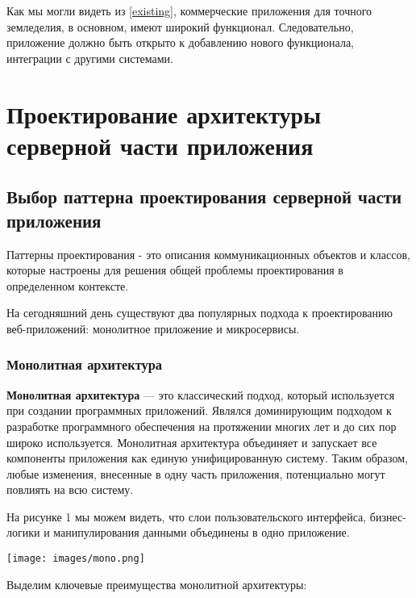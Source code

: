     Как мы могли видеть из \ref{existing}, коммерческие приложения для точного земледелия, в основном, имеют широкий функционал. Следовательно, приложение должно быть открыто к добавлению нового функционала, интеграции с другими системами. 
    
\chapter{Проектирование архитектуры серверной части приложения}
    \section{Выбор паттерна проектирования серверной части приложения} \label{pattern}

    Паттерны проектирования - это описания коммуникационных объектов и классов, которые настроены для решения общей проблемы проектирования в определенном контексте. \cite{design}
    
    На сегодняшний день существуют два популярных подхода к проектированию веб-приложений: монолитное приложение и микросервисы.
        \subsection{Монолитная архитектура}
        \textbf{Монолитная архитектура} — это классический подход, который используется при создании программных приложений. Являлся доминирующим подходом к разработке программного обеспечения на протяжении многих лет и до сих пор широко используется. Монолитная архитектура объединяет и запускает все компоненты приложения как единую унифицированную систему. Таким образом, любые изменения, внесенные в одну часть приложения, потенциально могут повлиять на всю систему. \cite{baeldung}
    
        На рисунке 1 мы можем видеть, что слои пользовательского интерфейса, бизнес-логики и манипулирования данными объединены в одно приложение. 
    
        \noindent\begin{minipage}[t]{\textwidth}
             \begin{center}
             \texttt{[image: images/mono.png]}
             \end{center} \label{fig:Moreno}
        \end{minipage}

        Выделим ключевые преимущества монолитной архитектуры:

